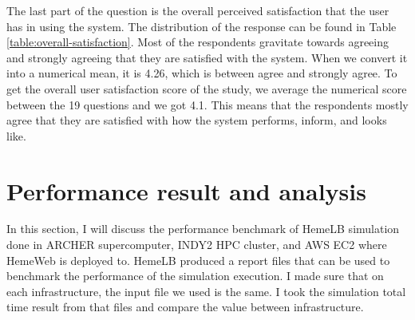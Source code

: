 \begin{center}
\label{table:overall-satisfaction}
\end{center}
\vspace{0.5cm}

The last part of the question is the overall perceived satisfaction that the user has in using the system. The distribution of the response can be found in Table \ref{table:overall-satisfaction}. Most of the respondents gravitate towards agreeing and strongly agreeing that they are satisfied with the system. When we convert it into a numerical mean, it is 4.26, which is between agree and strongly agree. To get the overall user satisfaction score of the study, we average the numerical score between the 19 questions and we got 4.1. This means that the respondents mostly agree that they are satisfied with how the system performs, inform, and looks like.

\section{Performance result and analysis}

In this section, I will discuss the performance benchmark of HemeLB simulation done in ARCHER supercomputer, INDY2 HPC cluster, and AWS EC2 where HemeWeb is deployed to. HemeLB produced a report files that can be used to benchmark the performance of the simulation execution. I made sure that on each infrastructure, the input file we used is the same. I took the simulation total time result from that files and compare the value between infrastructure.


